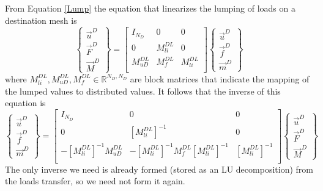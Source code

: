 \documentclass[10pt,letterpaper,oneside,notitlepage]{article}
\begin{document}
From Equation \ref{Lump} the equation that linearizes the lumping of loads on a destination mesh is
\begin{equation}
\label{LumpD}
   \left\{   \begin{matrix} \vec{u}^D \\ \vec{F}^{D} \\ \vec{M}^{D} \end{matrix} \right\} 
=
   \begin{bmatrix}
   I_{\mathit{N_D}} & 0           & 0   \\
   0                & M_{li}^{DL} & 0   \\
   M_{uD}^{DL}      & M_{f}^{DL}  & M_{li}^{DL} \\
   \end{bmatrix}
   \left\{   \begin{matrix} \vec{u}^D \\ \vec{f}^{D} \\ \vec{m}^{D} \end{matrix} \right\} 
\end{equation}
where $M_{li}^{DL}, M_{uD}^{DL}, M_{f}^{DL} \in \mathbb{R}^{ \mathit{N_{D}},\mathit{N_{D}}}$ are block matrices that indicate the mapping of the lumped values to distributed values. It follows that the inverse of this equation is
\begin{equation}
\label{InvLumpD}
   \left\{   \begin{matrix} \vec{u}^D \\ \vec{f}^{D} \\ \vec{m}^{D} \end{matrix} \right\} 
=
   \begin{bmatrix}
   I_{\mathit{N_D}} & 0                & 0   \\
   0                       & \left[ M_{li}^{DL} \right]^{-1} & 0   \\
   -\left[ M_{li}^{DL} \right]^{-1} M_{uD}^{DL} & 
   -\left[ M_{li}^{DL} \right]^{-1} M_{f}^{DL} \left[ M_{li}^{DL} \right]^{-1}  &
    \left[ M_{li}^{DL} \right]^{-1} \\
   \end{bmatrix}
   \left\{   \begin{matrix} \vec{u}^D \\ \vec{F}^{D} \\ \vec{M}^{D} \end{matrix} \right\} 
\end{equation}
The only inverse we need is already formed (stored as an LU decomposition) from the loads transfer, so we need not form it again.
\end{document}
